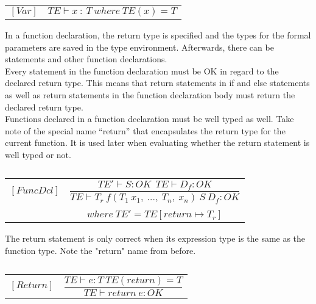 \begin{table}[H]
    \begin{center}
    \begin{longtable}[c] { r c }
        $[Var]$ 
        & 
        \( {TE \vdash x\ :\ T}\ where\ {TE(x) = T} \)
    \end{longtable}
    \caption{}\label{type:var-ref}
        \end{center}
\end{table}
In a function declaration, the return type is specified and the types for the formal parameters are saved in the type environment. Afterwards, there can be statements and other function declarations. \\
Every statement in the function declaration must be OK in regard to the declared return type. This means that return statements in if and else statements as well as return statements in the function declaration body must return the declared return type. \\
Functions declared in a function declaration must be well typed as well.
Take note of the special name “return” that encapsulates the return type for the current function. It is used later when evaluating whether the return statement is well typed or not.
\begin{table}[H]
    \begin{center}
    \begin{longtable}[c] { r c }
        $[FuncDcl]$ 
        & 
        \( \dfrac{TE' \vdash S : OK \ \ TE \vdash D_{f}: OK} 
        {T E \vdash T_r \ f(T_1 \ x_1,\ ...,\ T_n,\ x_n)\ S\ D_f : OK} \) 
        \\ \\
        & 
        \( {where \ TE' = TE[return \mapsto T_r]} \)
    \end{longtable}
    \caption{}
        \end{center}
\end{table}

The return statement is only correct when its expression type is the same as the function type. Note the "return" name from before.
\begin{table}[H]
    \begin{center}
    \begin{longtable}[c] { r c }
        $[Return]$ 
        & 
        \( \dfrac{T E  \vdash e  :  T\ TE(return) = T}{T E \vdash return \ e : OK} \)

    \end{longtable}
    \caption{}
        \end{center}
\end{table}

